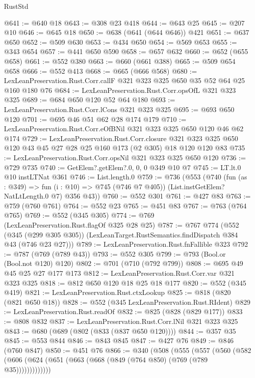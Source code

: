 \begin{lexlean}{RustStd}
\begin{coremodule}
@641 := @640 @18
@643 := @308 @23 @418
@644 := @643 @25
@645 := @207 @10
@646 := @645 @18
@650 := @638 (@641 (@644 @646)) @421
@651 := @637 @650
@652 := @509 @630
@653 := @434 @650
@654 := @569 @653
@655 := @343 @654
@657 := @441 @650 @590
@658 := @657 @632
@660 := @652 (@655 @658)
@661 := @552 @380
@663 := @660 (@661 @388)
@665 := @509 @654 @658
@666 := @552 @413
@668 := @665 (@666 @568)
@680 := LexLeanPreservation.Rust.Corr.callF @321 @323 @325 @650 @35 @52 @64 @25 @160 @180 @76
@684 := LexLeanPreservation.Rust.Corr.opsOfL @321 @323 @325
@689 := @684 @650 @120 @52 @64 @180
@693 := LexLeanPreservation.Rust.Corr.lCons @321 @323 @325
@695 := @693 @650 @120
@701 := @695 @46 @51 @62 @28 @174 @179
@710 := LexLeanPreservation.Rust.Corr.eOfBNil @321 @323 @325 @650 @120 @46 @62 @174
@729 := LexLeanPreservation.Rust.Corr.closure
    @321
    @323
    @325
    @650
    @120
    @43
    @45
    @27
    @28
    @25
    @160
    @173
    (@2 @305)
    @18
    @120
    @120
    @83
@735 := LexLeanPreservation.Rust.Corr.opsNil @321 @323 @325 @650 @120
@736 := @729 @735
@740 := GetElem?.getElem?.{0, 0, 0} @349 @10 @7
@745 := LT.lt.{0} @10 instLTNat @361
@746 := List.length.{0}
@759 := @736
    (@553
      (@740
        (fun (as : @349) => fun (i : @10) => @745 (@746 @7 @405))
        (List.instGetElem?NatLtLength.{0} @7)
        @356
        @43))
@760 := @552 @301
@761 := @427 @83
@763 := @759 (@760 @761)
@764 := @552 @23
@765 := @451 @83
@767 := @763 (@764 @765)
@769 := @552 (@345 @305)
@774 := @769 (LexLeanPreservation.Rust.flagOf @325 @28 @25)
@787 := @767
    @774
    (@552
      (@345 (@299 @305 @305))
      (LexLeanTarget.RustSemantics.findDispatch @384 @43 (@746 @23 @27)))
@789 := LexLeanPreservation.Rust.fnFallible @323
@792 := @787 (@769 (@789 @43))
@793 := @552 @305
@799 := @793 (Bool.or (Bool.not @120) @120)
@802 := @701 (@710 (@792 @799))
@808 := @695 @49 @45 @25 @27 @177 @173
@812 := LexLeanPreservation.Rust.Corr.var @321 @323 @325
@818 := @812 @650 @120 @18 @25 @18 @177
@820 := @552 (@345 @419)
@821 := LexLeanPreservation.Rust.ctxLookup
@825 := @818 (@820 (@821 @650 @18))
@828 := @552 (@345 LexLeanPreservation.Rust.RIdent)
@829 := LexLeanPreservation.Rust.readOf
@832 := @825 (@828 (@829 @177))
@833 := @808 @832
@837 := LexLeanPreservation.Rust.Corr.lNil @321 @323 @325
@843 := @680 (@689 (@802 (@833 (@837 @650 @120))))
@844 := @357 @35
@845 := @553 @844
@846 := @843 @845
@847 := @427 @76
@849 := @846 (@760 @847)
@850 := @451 @76
@866 := @340
    (@508
      (@555
        (@557
          (@560 (@582 (@606 (@624 (@651 (@663 (@668 (@849 (@764 @850) (@769 (@789 @35)))))))))))))

\end{coremodule}
\end{lexlean}
